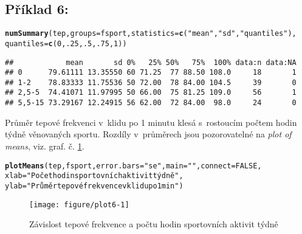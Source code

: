 \documentclass[twoside]{article}\usepackage[]{graphicx}\usepackage[]{color}
\makeatletter
\def\maxwidth{ %
  \ifdim\Gin@nat@width>\linewidth
    \linewidth
  \else
    \Gin@nat@width
  \fi
}
\newcommand{\hlnum}[1]{\textcolor[rgb]{0.686,0.059,0.569}{#1}}%
\newcommand{\hlstr}[1]{\textcolor[rgb]{0.192,0.494,0.8}{#1}}%
\newcommand{\hlstd}[1]{\textcolor[rgb]{0.345,0.345,0.345}{#1}}%
\newcommand{\hlkwc}[1]{\textcolor[rgb]{0.333,0.667,0.333}{#1}}%
\newcommand{\hlkwd}[1]{\textcolor[rgb]{0.737,0.353,0.396}{\textbf{#1}}}%
\newenvironment{kframe}{%
 \def\at@end@of@kframe{}%
 \ifinner\ifhmode%
  \def\at@end@of@kframe{\end{minipage}}%
  \begin{minipage}{\columnwidth}%
 \fi\fi%
 \def\FrameCommand##1{\hskip\@totalleftmargin \hskip-\fboxsep
 \colorbox{shadecolor}{##1}\hskip-\fboxsep
     \hskip-\linewidth \hskip-\@totalleftmargin \hskip\columnwidth}%
 \MakeFramed {\advance\hsize-\width
   \@totalleftmargin\z@ \linewidth\hsize
   \@setminipage}}%
 {\par\unskip\endMakeFramed%
 \at@end@of@kframe}
\newenvironment{knitrout}{}{} %
\makeatother
\begin{document}
\subsection*{Příklad 6:}
\begin{knitrout}
\color{fgcolor}\begin{kframe}
\begin{alltt}
\hlkwd{numSummary}\hlstd{(tep,} \hlkwc{groups}\hlstd{=fsport,} \hlkwc{statistics}\hlstd{=}\hlkwd{c}\hlstd{(}\hlstr{"mean"}\hlstd{,} \hlstr{"sd"}\hlstd{,} \hlstr{"quantiles"}\hlstd{),}
    \hlkwc{quantiles}\hlstd{=}\hlkwd{c}\hlstd{(}\hlnum{0}\hlstd{,}\hlnum{.25}\hlstd{,}\hlnum{.5}\hlstd{,}\hlnum{.75}\hlstd{,}\hlnum{1}\hlstd{))}
\end{alltt}
\begin{verbatim}
##            mean       sd 0%   25% 50%   75%  100% data:n data:NA
## 0      79.61111 13.35550 60 71.25  77 88.50 108.0     18       1
## 1-2    78.83333 11.75536 50 72.00  78 84.00 104.5     39       0
## 2,5-5  74.41071 11.97995 50 66.00  75 81.25 109.0     56       1
## 5,5-15 73.29167 12.24915 56 62.00  72 84.00  98.0     24       0
\end{verbatim}
\end{kframe}
\end{knitrout}

Průměr tepové frekvenci v~klidu po 1 minutu klesá s~rostoucím počtem hodin týdně věnovaných sportu. Rozdíly v~průměrech jsou pozorovatelné na \emph{plot of means}, viz. graf. č. \ref{fig:plot6}.

\begin{knitrout}
\color{fgcolor}\begin{kframe}
\begin{alltt}
\hlkwd{plotMeans}\hlstd{(tep, fsport,} \hlkwc{error.bars}\hlstd{=}\hlstr{"se"}\hlstd{,} \hlkwc{main}\hlstd{=}\hlstr{""}\hlstd{,} \hlkwc{connect}\hlstd{=}\hlnum{FALSE}\hlstd{,}
    \hlkwc{xlab}\hlstd{=}\hlstr{"Počet hodin sportovních aktivit týdně"}\hlstd{,}
    \hlkwc{ylab}\hlstd{=}\hlstr{"Průměr tepové frekvence v klidu po 1 min"}\hlstd{)}
\end{alltt}
\end{kframe}\begin{figure}[h]
\texttt{[image: figure/plot6-1]} \caption[Závislost tepové frekvence a počtu hodin sportovních aktivit týdně]{Závislost tepové frekvence a počtu hodin sportovních aktivit týdně}\label{fig:plot6}
\end{figure}


\end{knitrout}
\end{document}
